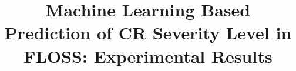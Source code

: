 \documentclass[10pt, conference]{IEEEtran}
\begin{document}
\title{Machine Learning Based Prediction of CR Severity Level in FLOSS: Experimental Results
}

\author{
	\and
}
\maketitle



\IEEEpeerreviewmaketitle








\end{document}
